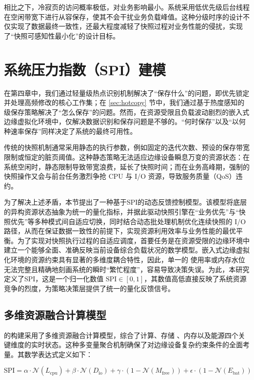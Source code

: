相比之下，冷寂页的访问概率极低，对业务影响最小。系统采用低优先级后台线程在空闲带宽下进行从容保存，使其不会干扰业务负载峰值。这种分级时序的设计不仅实现了数据最终一致性，还最大程度减轻了快照过程对业务性能的侵扰，实现了“快照可感知性最小化”的设计目标。

\section{系统压力指数（SPI）建模}

在第四章中，我们通过轻量级热点识别机制解决了“保存什么”的问题，即优先锁定并处理高频修改的核心工作集；在 \ref{sec:hotcopy} 节中，我们通过基于热度感知的级保存策略解决了“怎么保存”的问题。然而，在资源受限且负载波动剧烈的嵌入式边缘虚拟化环境中，仅解决数据识别和保存问题是不够的。“何时保存”以及“以何种速率保存”同样决定了系统的最终可用性。

传统的快照机制通常采用静态的执行参数，例如固定的迭代次数、预设的保存带宽限制或恒定的脏页阈值。这种静态策略无法适应边缘设备瞬息万变的资源状态：在系统空闲时，静态限制导致带宽浪费，延长了快照时间；而在业务高峰期，强制的快照操作又会与前台任务激烈争抢 CPU 与 I/O 资源，导致服务质量（QoS）违约。

为了解决上述矛盾，本节提出了一种基于SPI的动态反馈控制模型。该模型将底层的异构资源状态抽象为统一的量化指标，并据此驱动快照引擎在“业务优先”与“快照优先”等多种模式间自适应切换，同时结合动态批处理机制优化连续快照的 I/O 路径，从而在保证数据一致性的前提下，实现资源利用效率与业务性能的最优平衡。为了实现对快照执行过程的自适应调度，首要任务是在资源受限的边缘环境中建立一个能够全面、准确反映当前设备综合负载状况的数学模型。嵌入式边缘虚拟化环境的资源约束具有显著的多维度耦合特性，因此，单一的  使用率或内存水位无法完整且精确地刻画系统的瞬时“繁忙程度”，容易导致决策失误。为此，本研究定义了SPI，这是一个归一化数值 $\text{SPI} \in [0, 1]$，其数值高低直接反映了系统资源竞争的烈度，为策略决策层提供了统一的量化反馈信号。

\subsection{多维资源融合计算模型}

 的构建采用了多维资源融合计算模型，综合了计算、存储 、内存以及能源四个关键维度的实时状态。这种多变量聚合机制确保了对边缘设备复杂约束条件的全面考量。其数学表达式定义如下：

$$
\text{SPI} = \alpha \cdot \mathcal{N}(L_{\text{cpu}}) + \beta \cdot \mathcal{N}(D_{\text{io}}) + \gamma \cdot (1 - \mathcal{N}(M_{\text{free}})) + \epsilon \cdot (1 - \mathcal{N}(E_{\text{bat}}))
$$

